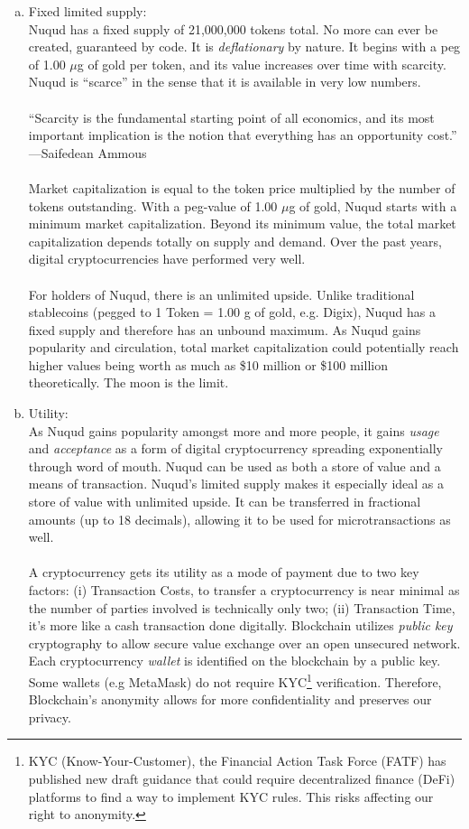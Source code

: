 \documentclass[12pt]{article}
\begin{document}
\begin{enumerate}[(a)]
\item Fixed limited supply:\\
  Nuqud has a fixed supply of 21,000,000 tokens total. No more can ever be created, guaranteed by code. It is \emph{deflationary} by nature. It begins with a peg of 1.00 $\mu$g of gold per token, and its value increases over time with scarcity. Nuqud is “scarce” in the sense that it is available in very low numbers.\\
  {}\\
  “Scarcity is the fundamental starting point of all economics, and its most important implication is the notion that everything has an opportunity cost.”
 —Saifedean Ammous \cite{ammous2018bitcoin}\\
 {}\\
Market capitalization is equal to the token price multiplied by the number of tokens outstanding. With a peg-value of 1.00 $\mu$g of gold, Nuqud starts with a minimum market capitalization. Beyond its minimum value, the total market capitalization depends totally on supply and demand. Over the past years, digital cryptocurrencies have performed very well.\\ 
{}\\
For holders of Nuqud, there is an unlimited upside. Unlike traditional stablecoins (pegged to 1 Token = 1.00 g of gold, e.g. Digix), Nuqud has a fixed supply and therefore has an unbound maximum. As Nuqud gains popularity and circulation, total market capitalization could potentially reach higher values being worth as much as \$10 million or \$100 million theoretically. The moon is the limit.

\item Utility:\\
As Nuqud gains popularity amongst more and more people, it gains \emph{usage} and \emph{acceptance} as a form of digital cryptocurrency spreading exponentially through word of mouth. Nuqud can be used as both a store of value and a means of transaction. Nuqud’s limited supply makes it especially ideal as a store of value with unlimited upside. It can be transferred in fractional amounts (up to 18 decimals), allowing it to be used for microtransactions as well.\\
{}\\
A cryptocurrency gets its utility as a mode of payment due to two key factors: (i) Transaction Costs, to transfer a cryptocurrency is near minimal as the number of parties involved is technically only two; (ii) Transaction Time, it’s more like a cash transaction done digitally. Blockchain utilizes \emph{public key} cryptography to allow secure value exchange over an open unsecured network. Each cryptocurrency \emph{wallet} is identified on the blockchain by a public key. Some wallets (e.g MetaMask) do not require KYC\footnote{KYC (Know-Your-Customer), the Financial Action Task Force (FATF) has published new draft guidance that could require decentralized finance (DeFi) platforms to find a way to implement KYC rules. This risks affecting our right to anonymity.} verification. Therefore, Blockchain's anonymity allows for more confidentiality and preserves our privacy.


\end{enumerate}
\end{document}
